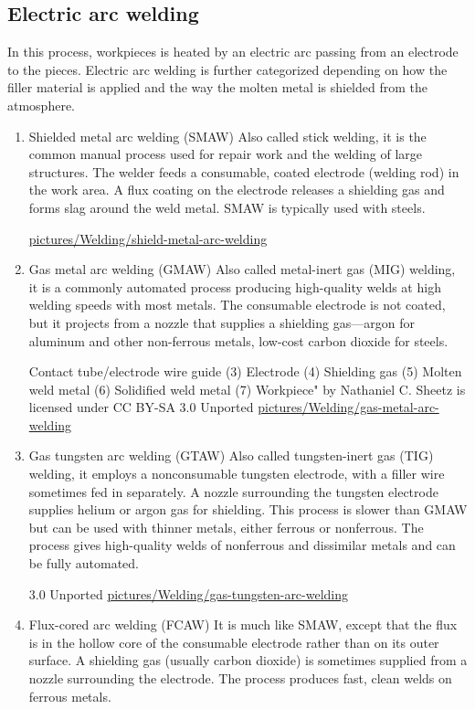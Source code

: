 \documentclass[a4paper,openany,12pt]{book}
\begin{document}
{{\subsection{Electric arc welding}
\label{sec:org4d14614}
In this process, workpieces is heated by an electric arc passing from an
electrode to the pieces. Electric arc welding is further categorized
depending on how the filler material is applied and the way the molten
metal is shielded from the atmosphere.

\begin{enumerate}
\item Shielded metal arc welding (SMAW)
\label{sec:org4e7081e}
Also called stick welding, it is the common manual process used for
repair work and the welding of large structures. The welder feeds a
consumable, coated electrode (welding rod) in the work area. A flux
coating on the electrode releases a shielding gas and forms slag around
the weld metal. SMAW is typically used with steels.


\url{pictures/Welding/shield-metal-arc-welding}

\item Gas metal arc welding (GMAW)
\label{sec:orgf64251d}
Also called metal-inert gas (MIG) welding, it is a commonly automated
process producing high-quality welds at high welding speeds with most
metals. The consumable electrode is not coated, but it projects from a
nozzle that supplies a shielding gas---argon for aluminum and other
non-ferrous metals, low-cost carbon dioxide for steels.


Contact tube/electrode wire guide (3) Electrode (4) Shielding gas (5)
Molten weld metal (6) Solidified weld metal (7) Workpiece" by Nathaniel
C. Sheetz is licensed under CC BY-SA 3.0 Unported
\url{pictures/Welding/gas-metal-arc-welding}

\item Gas tungsten arc welding (GTAW)
\label{sec:orgecdc5e6}
Also called tungsten-inert gas (TIG) welding, it employs a nonconsumable
tungsten electrode, with a filler wire sometimes fed in separately. A
nozzle surrounding the tungsten electrode supplies helium or argon gas
for shielding. This process is slower than GMAW but can be used with
thinner metals, either ferrous or nonferrous. The process gives
high-quality welds of nonferrous and dissimilar metals and can be fully
automated.


3.0 Unported
\url{pictures/Welding/gas-tungsten-arc-welding}

\item Flux-cored arc welding (FCAW)
\label{sec:org4cbcead}
It is much like SMAW, except that the flux is in the hollow core of the
consumable electrode rather than on its outer surface. A shielding gas
(usually carbon dioxide) is sometimes supplied from a nozzle surrounding
the electrode. The process produces fast, clean welds on ferrous metals.


\end{enumerate}}}
\end{document}

